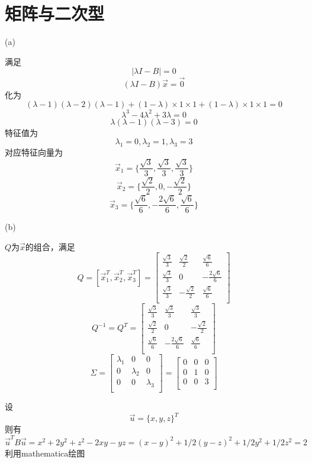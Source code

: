 \documentclass{article}
\begin{document}
\section{矩阵与二次型}
\par
(a)\par
满足
$$|\lambda I-B|=0$$
$$(\lambda I-B)\vec x=\vec 0$$
化为
$$(\lambda-1)(\lambda-2)(\lambda-1)+(1-\lambda)\times 1\times 1+(1-\lambda)\times 1\times 1=0$$
$$\lambda^3-4\lambda^2+3\lambda=0$$
$$\lambda(\lambda-1)(\lambda-3)=0$$
特征值为
$$\lambda_1=0,\lambda_2=1,\lambda_3=3$$
对应特征向量为
$$\vec x_1=\{\frac{\sqrt 3}{3},\frac{\sqrt 3}{3},\frac{\sqrt 3}{3}\}$$
$$\vec x_2=\{\frac{\sqrt 2}{2},0,-\frac{\sqrt 2}{2}\}$$
$$\vec x_3=\{\frac{\sqrt 6}{6},-\frac{2\sqrt 6}{6},\frac{\sqrt 6}{6}\}$$
\par
(b)\par
$Q$为$\vec x$的组合，满足
$$Q=\left[\vec x_1^T,\vec x_2^T,\vec x_3^T\right]=
\begin{bmatrix}
    \frac{\sqrt 3}{3} & \frac{\sqrt 2}{2} & \frac{\sqrt 6}{6}\\
    \frac{\sqrt 3}{3} & 0 & -\frac{2\sqrt 6}{6}\\
    \frac{\sqrt 3}{3} & -\frac{\sqrt 2}{2} & \frac{\sqrt 6}{6}\\   
\end{bmatrix}
$$
$$
Q^{-1}=Q^T=
\begin{bmatrix}
    \frac{\sqrt 3}{3} & \frac{\sqrt 3}{3} & \frac{\sqrt 3}{3}\\
    \frac{\sqrt 2}{2} & 0 & -\frac{\sqrt 2}{2}\\
    \frac{\sqrt 6}{6} & -\frac{2\sqrt 6}{6} & \frac{\sqrt 6}{6}\\
\end{bmatrix}
$$
$$
\Sigma=
\begin{bmatrix}
    \lambda_1 & 0 & 0\\
    0 & \lambda_2 & 0\\
    0 & 0 & \lambda_3\\
\end{bmatrix}
=
\begin{bmatrix}
    0 & 0 & 0\\
    0 & 1 & 0\\
    0 & 0 & 3\\
\end{bmatrix}
$$
\par
设
$$\vec u=\{x,y,z\}^T$$
则有
$$\vec u^T B\vec u=x^2+2y^2+z^2-2xy-yz=(x-y)^2+1/2(y-z)^2+1/2y^2+1/2z^2=2$$
利用mathematica绘图
\end{document}
